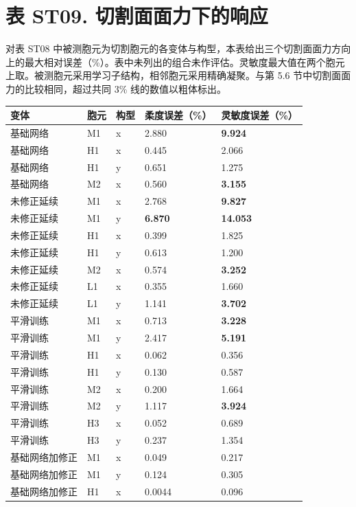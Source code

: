 \documentclass[preprint,12pt,authoryear]{elsarticle}
\begin{document}
\section{表 ST09. 切割面面力下的响应}

对表 ST08 中被测胞元为切割胞元的各变体与构型，本表给出三个切割面面力方向上的最大相对误差（\%）。表中未列出的组合未作评估。灵敏度最大值在两个胞元上取。被测胞元采用学习子结构，相邻胞元采用精确凝聚。与第 5.6 节中切割面面力的比较相同，超过共同 3\% 线的数值以粗体标出。

{\small
\begin{longtable}[]{@{}lllll@{}}
\toprule\noalign{}
变体 & 胞元 & 构型 & 柔度误差（\%） & 灵敏度误差（\%） \\
\midrule\noalign{}
\endhead
\bottomrule\noalign{}
\endlastfoot
基础网络 & M1 & x & 2.880 & \textbf{9.924} \\
基础网络 & H1 & x & 0.445 & 2.066 \\
基础网络 & H1 & y & 0.651 & 1.275 \\
基础网络 & M2 & x & 0.560 & \textbf{3.155} \\
未修正延续 & M1 & x & 2.768 & \textbf{9.827} \\
未修正延续 & M1 & y & \textbf{6.870} & \textbf{14.053} \\
未修正延续 & H1 & x & 0.399 & 1.825 \\
未修正延续 & H1 & y & 0.613 & 1.200 \\
未修正延续 & M2 & x & 0.574 & \textbf{3.252} \\
未修正延续 & L1 & x & 0.355 & 1.660 \\
未修正延续 & L1 & y & 1.141 & \textbf{3.702} \\
平滑训练 & M1 & x & 0.713 & \textbf{3.228} \\
平滑训练 & M1 & y & 2.417 & \textbf{5.191} \\
平滑训练 & H1 & x & 0.062 & 0.356 \\
平滑训练 & H1 & y & 0.130 & 0.587 \\
平滑训练 & M2 & x & 0.200 & 1.664 \\
平滑训练 & M2 & y & 1.117 & \textbf{3.924} \\
平滑训练 & H3 & x & 0.052 & 0.689 \\
平滑训练 & H3 & y & 0.237 & 1.354 \\
基础网络加修正 & M1 & x & 0.049 & 0.217 \\
基础网络加修正 & M1 & y & 0.124 & 0.305 \\
基础网络加修正 & H1 & x & 0.0044 & 0.096 \\

\end{longtable}}
\end{document}
